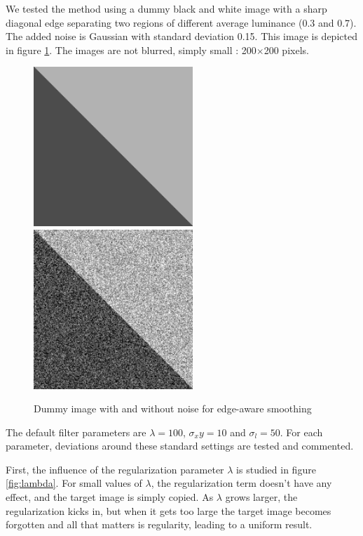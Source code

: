 \documentclass{article}
\begin{document}
\medskip

We tested the method using a dummy black and white image with a sharp diagonal edge separating two regions of different average luminance (0.3 and 0.7). The added noise is Gaussian with standard deviation 0.15. This image is depicted in figure \ref{fig:dummy}. The images are not blurred, simply small : 200$\times$200 pixels.

\begin{figure}
    \centering
    \includegraphics[width=6cm]{pictures/BW/reference.png}
    \hspace{1cm}
    \includegraphics[width=6cm]{pictures/BW/noisy_reference.png}
    \caption{Dummy image with and without noise for edge-aware smoothing}
    \label{fig:dummy}
\end{figure}

The default filter parameters are $\lambda = 100$, $\sigma_xy = 10$ and $\sigma_l = 50$. For each parameter, deviations around these standard settings are tested and commented.

\medskip

First, the influence of the regularization parameter $\lambda$ is studied in figure \ref{fig:lambda}. For small values of $\lambda$, the regularization term doesn't have any effect, and the target image is simply copied. As $\lambda$ grows larger, the regularization kicks in, but when it gets too large the target image becomes forgotten and all that matters is regularity, leading to a uniform result.
\end{document}

